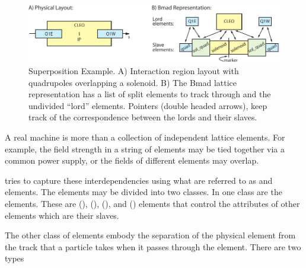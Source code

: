 \begin{figure}[tb]
 \begin{center}
 \includegraphics[width=6.0in]{superimpose-ip.pdf}
 \caption[Superposition example.]{
Superposition Example. A) Interaction region layout with quadrupoles overlapping a solenoid. B) The
Bmad lattice representation has a list of split elements to track through and the undivided ``lord''
elements. Pointers (double headed arrows), keep track of the correspondence between the lords and
their slaves.
 }
 \label{f:super.ip}
 \end{center}
 \end{figure}


A real machine is more than a collection of independent lattice elements. For example, the field
strength in a string of elements may be tied together via a common power supply, or the fields of
different elements may overlap.

\bmad tries to capture these interdependencies using what are referred to as  and
 elements. The  elements may be divided into two classes. In one class are the
 elements.  These are  (),  (),
 (), and  () elements that control the
attributes of other elements which are their slaves.

The other class of  elements embody the separation of the physical element from the track
that a particle takes when it passes through the element. There are two types

